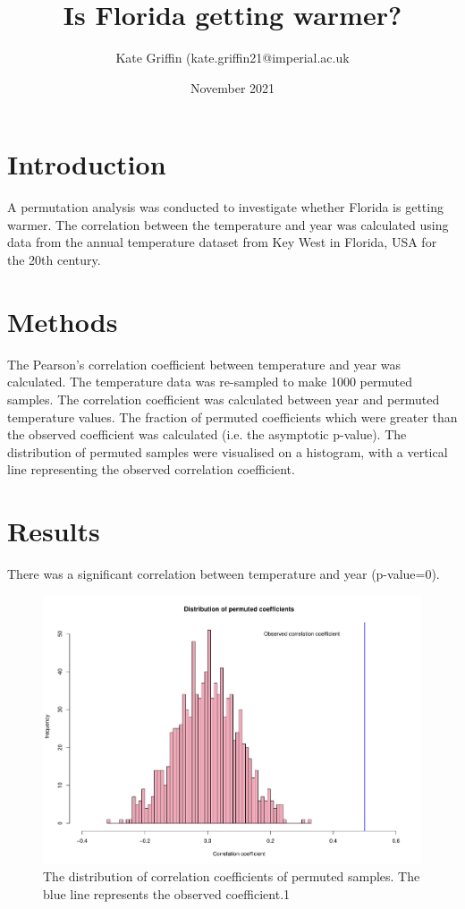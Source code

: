 \documentclass{article}
\title{Is Florida getting warmer?}
\author{Kate Griffin (kate.griffin21@imperial.ac.uk}
\date{November 2021}
\begin{document}
	
	\maketitle
	
	\section{Introduction}
	A permutation analysis was conducted to investigate whether Florida is getting warmer. The correlation between the temperature and year was calculated using data from the annual temperature dataset from Key West in Florida, USA for the 20th century. 
	
	\section{Methods}
	The Pearson's correlation coefficient between temperature and year was calculated. The temperature data was re-sampled to make 1000 permuted samples. The correlation coefficient was calculated between year and permuted temperature values. The fraction of permuted coefficients which were greater than the observed coefficient was calculated (i.e. the asymptotic p-value). The distribution of permuted samples were visualised on a histogram, with a vertical line representing the observed correlation coefficient. 
	
	\section{Results} 
	There was a significant correlation between temperature and year (p-value=0). 
	\begin{figure}[H]
		\includegraphics[scale=0.4]{../results/Florida_hist.pdf}
		\caption{The distribution of correlation coefficients of permuted samples. The blue line represents the observed coefficient.1}
		\label{The distribution of correlation coefficients of permuted samples. The blue line represents the observed coefficient.1}
	\end{figure}
	
\end{document}
